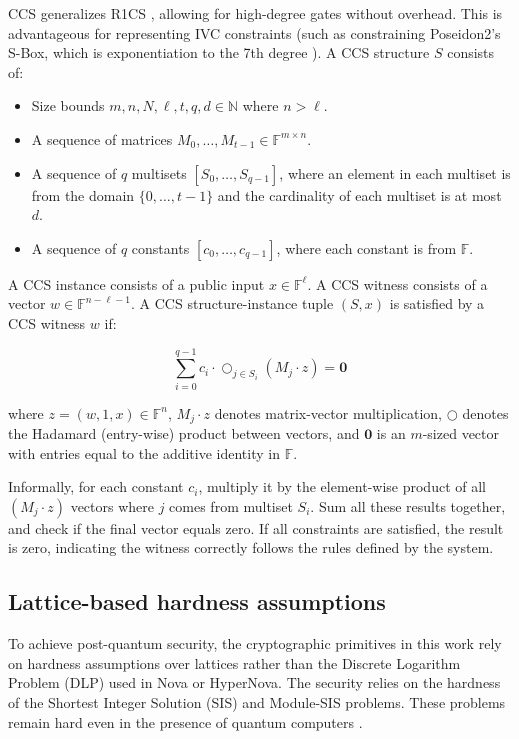CCS generalizes R1CS \cite{CCS}, allowing for high-degree gates without overhead. This is
advantageous for representing IVC constraints (such as constraining Poseidon2's
S-Box, which is exponentiation to the 7th degree \cite{Poseidon, Poseidon2}). A CCS structure $S$
consists of:

\begin{itemize}
	\item Size bounds $m, n, N, \ell, t, q, d \in \mathbb{N}$ where $n > \ell$.
	\item A sequence of matrices $M_0, \dots, M_{t-1} \in \mathbb{F}^{m \times n}$.
	\item A sequence of $q$ multisets $[S_0, \dots, S_{q-1}]$, where an
	      element in each multiset is from the domain $\{0, \dots, t-1\}$ and
	      the cardinality of each multiset is at most $d$.
	\item A sequence of $q$ constants $[c_0, \dots, c_{q-1}]$, where each
	      constant is from $\mathbb{F}$.
\end{itemize}

A CCS instance consists of a public input $x \in \mathbb{F}^\ell$. A CCS
witness consists of a vector $w \in \mathbb{F}^{n-\ell-1}$. A CCS
structure-instance tuple $(S, x)$ is satisfied by a CCS witness $w$ if:

\begin{equation}
	\sum_{i=0}^{q-1} c_i \cdot \bigcirc_{j \in S_i} (M_j \cdot z) = \mathbf{0}
\end{equation}


where $z = (w, 1, x) \in \mathbb{F}^n$, $M_j \cdot z$ denotes matrix-vector
multiplication, $\bigcirc$ denotes the Hadamard (entry-wise) product between
vectors, and $\mathbf{0}$ is an $m$-sized vector with entries equal to the
additive identity in $\mathbb{F}$.

Informally, for each constant $c_i$, multiply it by the element-wise product
of all $(M_j \cdot z)$ vectors where $j$ comes from multiset $S_i$. Sum all
these results together, and check if the final vector equals zero.
If all constraints are satisfied, the result is zero, indicating
the witness correctly follows the rules defined by the system.

\subsection{Lattice-based hardness assumptions}

To achieve post-quantum security, the cryptographic primitives in this work
rely on hardness assumptions over lattices rather than the Discrete Logarithm
Problem (DLP) used in Nova or HyperNova. The security relies on the hardness
of the Shortest Integer Solution (SIS) and Module-SIS problems. These problems
remain hard even in the presence of quantum computers \cite{AjtaiLattices,
	Ajtai1998, LatticeTutorial, LatticesInZKP}.

